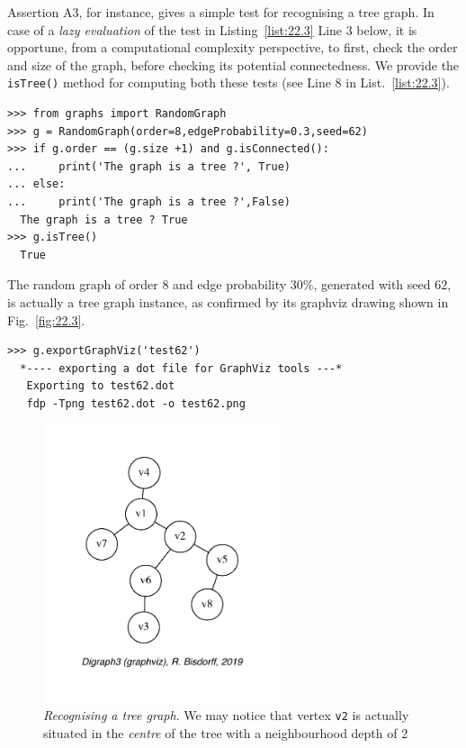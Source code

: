 Assertion A3, for instance, gives a simple test for recognising a tree graph. In case of a \emph{lazy evaluation} of the test in Listing~\vref{list:22.3} Line 3 below, it is opportune, from a computational complexity perspective, to first, check the order and size of the graph, before checking its potential connectedness. We provide the \texttt{isTree()} method for computing both these tests (see Line 8 in List.~\vref{list:22.3}).
\begin{lstlisting}[caption={Recognizing a tree graph.},label=list:22.3]
>>> from graphs import RandomGraph
>>> g = RandomGraph(order=8,edgeProbability=0.3,seed=62)
>>> if g.order == (g.size +1) and g.isConnected():
...     print('The graph is a tree ?', True)
... else:
...     print('The graph is a tree ?',False)   
  The graph is a tree ? True
>>> g.isTree()
  True  
\end{lstlisting}
The random graph of order $8$ and edge probability $30\%$, generated with seed $62$, is actually a tree graph instance, as confirmed by its graphviz drawing shown in Fig.~\vref{fig:22.3}.
\begin{lstlisting}
>>> g.exportGraphViz('test62')
  *---- exporting a dot file for GraphViz tools ---*
   Exporting to test62.dot
   fdp -Tpng test62.dot -o test62.png
\end{lstlisting}
\begin{figure}[ht]
\sidecaption[t]
\includegraphics[width=7cm]{Figures/22-3-test62.pdf}
\caption[Recognising a tree graph]{\emph{Recognising a tree graph}. We may notice that vertex \texttt{v2} is actually situated in the \emph{centre} of the tree with a neighbourhood depth of 2} 
\label{fig:22.3}       %
\end{figure}


